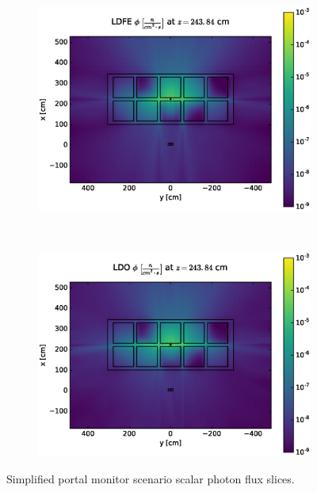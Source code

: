 \documentclass{article} %
\begin{document}
\begin{figure}[!htb]
\ContinuedFloat
\begin{subfigure}{\textwidth}
\centering
\includegraphics[max height=0.445\textheight]
{img/portal-fwd-flux-ldfe01.eps}
\end{subfigure}
\\
\begin{subfigure}{\textwidth}
\centering
\includegraphics[max height=0.445\textheight]
{img/portal-fwd-flux-ldo11.eps}
\end{subfigure}
\caption{Simplified portal monitor scenario scalar photon flux slices.}
\label{cargo-fwd-slices}
\end{figure}
\end{document}
